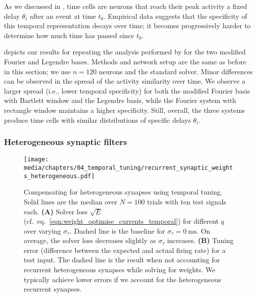 As we discussed in , time cells are neurons that reach their peak activity a fixed delay $\theta_i$ after an event at time $t_0$.
Empirical data suggests \citep[e.g.][]{macdonald2011hippocampal,tiganj2016sequential} that the specificity of this temporal representation decays over time; it becomes progressively harder to determine how much time has passed since $t_0$.

 depicts our results for repeating the analysis performed by  for the two modified Fourier and Legendre bases.
Methods and network setup are the same as before in this section; we use $n = 120$ neurons and the standard \NEF solver.
Minor differences can be observed in the spread of the activity similarity over time.
We observe a larger spread (i.e., lower temporal specificity) for both the modified Fourier basis with Bartlett window and the Legendre basis, while the Fourier system with rectangle window maintains a higher specificity.
Still, overall, the three systems produce time cells with similar distributions of specific delays $\theta_i$.

\subsubsection{Heterogeneous synaptic filters}

\begin{figure}
	\centering
	\texttt{[image: media/chapters/04\_temporal\_tuning/recurrent\_synaptic\_weights\_heterogeneous.pdf]}
	\caption[Compensating for heterogeneous synapses using temporal tuning]{Compensating for heterogeneous synapses using temporal tuning.
	Solid lines are the median over $N = 100$ trials with ten test signals each.
	\textbf{(A)} Solver loss $\sqrt{E}$ (cf.~eq.~\ref{eqn:weight_optimise_currents_temporal}) for different $q$ over varying $\sigma_\tau$.
	Dashed line is the baseline for $\sigma_\tau = \SI{0}{\milli\second}$.
	On average, the solver loss decreases slightly as $\sigma_\tau$ increases.
	\textbf{(B)} Tuning error (difference between the expected and actual firing rate) for a test input.
	The dashed line is the result when not accounting for recurrent heterogeneous synapses while solving for weights.
	We typically achieve lower errors if we account for the heterogeneous recurrent synapses.
	}
	\label{fig:recurrent_synaptic_weights_heterogeneous}
\end{figure}

